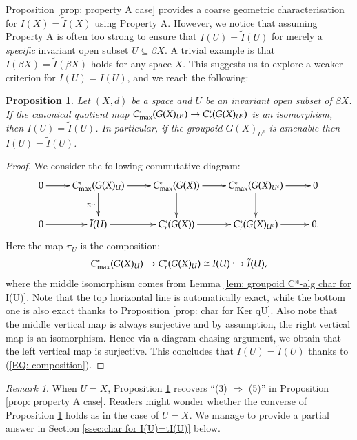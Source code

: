 \documentclass[12pt, a4paper]{amsart}
\numberwithin{equation}{section}
\newtheorem{prop}[thm]{Proposition}
\theoremstyle{definition}
\theoremstyle{remark}
\newtheorem{rem}[thm]{Remark}
\begin{document}
Proposition \ref{prop: property A case} provides a coarse geometric characterisation for $I(X) = \tilde{I}(X)$ using Property A. However, we notice that assuming Property A is often too strong to ensure that $I(U) = \tilde{I}(U)$ for merely a \emph{specific} invariant open subset $U \subseteq \beta X$. A trivial example is that $I(\beta X) = \tilde{I}(\beta X)$ holds for any space $X$. This suggests us to explore a weaker criterion for $I(U) = \tilde{I}(U)$, and we reach the following:

\begin{prop}\label{prop: criteria to ensure I(U) = tilde I(U)}
Let $(X,d)$ be a space and $U$ be an invariant open subset of $\beta X$. If the canonical quotient map $C^*_{{\rm max}}(G(X)_{U^c}) \to C^*_r(G(X)_{U^c})$ is an isomorphism, then $I(U)=\tilde{I}(U)$. In particular, if the groupoid $G(X)_{U^c}$ is amenable then $I(U)=\tilde{I}(U)$.
\end{prop}

\begin{proof}
We consider the following commutative diagram:
\begin{equation}\label{EQ: comm. diagram}
\xymatrix{
		0 \ar[r] & C^*_{{\rm max}}(G(X)_U) \ar[r] \ar[d]_{\pi_U} & C^*_{{\rm max}}(G(X)) \ar[r] \ar[d] & C^*_{{\rm max}}(G(X)_{U^c}) \ar[r] \ar[d] & 0\\
		0 \ar[r] & \tilde{I}(U) \ar[r] & C^*_{r}(G(X)) \ar[r] & C^*_{r}(G(X)_{U^c}) \ar[r] & 0.
	}
\end{equation}
Here the map $\pi_U$ is the composition:
\begin{equation}\label{EQ: composition}
C^*_{{\rm max}}(G(X)_U) \to C^*_r(G(X)_U) \cong I(U) \hookrightarrow \tilde{I}(U),
\end{equation}
where the middle isomorphism comes from Lemma \ref{lem: groupoid C*-alg char for I(U)}. Note that the top horizontal line is automatically exact, while the bottom one is also exact thanks to Proposition \ref{prop: char for Ker qU}. Also note that the middle vertical map is always surjective and by assumption, the right vertical map is an isomorphism. Hence via a diagram chasing argument, we obtain that the left vertical map is surjective. This concludes that $I(U)=\tilde{I}(U)$ thanks to (\ref{EQ: composition}).
\end{proof}

\begin{rem}\label{rem: special case of U=X}
When $U=X$, Proposition \ref{prop: criteria to ensure I(U) = tilde I(U)} recovers ``(3) $\Rightarrow$ (5)'' in Proposition \ref{prop: property A case}. Readers might wonder whether the converse of Proposition \ref{prop: criteria to ensure I(U) = tilde I(U)} holds as in the case of $U=X$. We manage to provide a partial answer in Section \ref{ssec:char for I(U)=tI(U)} below.
\end{rem}
\end{document}
